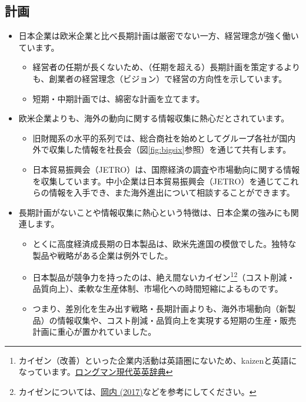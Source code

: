 \documentclass[
]{book}
\begin{document}
\hypertarget{japan-plan}{%
\subsection{計画}\label{japan-plan}}

\begin{itemize}
\item
  日本企業は欧米企業と比べ長期計画は厳密でない一方、経営理念が強く働いています。

  \begin{itemize}
  \item
    経営者の任期が長くないため、（任期を超える）長期計画を策定するよりも、創業者の経営理念（ビジョン）で経営の方向性を示しています。
  \item
    短期・中期計画では、綿密な計画を立てます。
  \end{itemize}
\item
  欧米企業よりも、海外の動向に関する情報収集に熱心だとされています。

  \begin{itemize}
  \item
    旧財閥系の水平的系列では、総合商社を始めとしてグループ各社が国内外で収集した情報を社長会（図\ref{fig:bigsix}参照）を通じて共有します。
  \item
    日本貿易振興会（JETRO）は、国際経済の調査や市場動向に関する情報を収集しています。中小企業は日本貿易振興会（JETRO）を通じてこれらの情報を入手でき、また海外進出について相談することができます。
  \end{itemize}
\item
  長期計画がないことや情報収集に熱心という特徴は、日本企業の強みにも関連します。

  \begin{itemize}
  \item
    とくに高度経済成長期の日本製品は、欧米先進国の模倣でした。独特な製品や戦略がある企業は例外でした。
  \item
    日本製品が競争力を持ったのは、絶え間ないカイゼン\footnote{カイゼン（改善）といった企業内活動は英語圏にないため、kaizenと英語になっています。\href{https://www.ldoceonline.com/jp/dictionary/kaizen}{ロングマン現代英英辞典}}\footnote{カイゼンについては、\href{https://toyokeizai.net/articles/-/202227}{岡内 (2017)}などを参考にしてください。}（コスト削減・品質向上）、柔軟な生産体制、市場化への時間短縮によるものです。
  \item
    つまり、差別化を生み出す戦略・長期計画よりも、海外市場動向（新製品）の情報収集や、コスト削減・品質向上を実現する短期の生産・販売計画に重心が置かれていました。
  \end{itemize}
\end{itemize}
\end{document}
